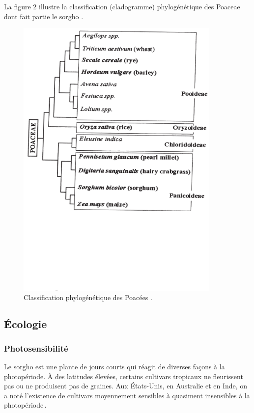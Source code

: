 \documentclass[a4paper,11pt]{article}
\begin{document}
La figure 2 illustre la classification (cladogramme) phylogénétique
des Poaceae dont fait partie le sorgho \cite{Paquet_2005}.



\begin{figure}%
  \begin{center}
    \includegraphics[width=10cm]{images/PhylogenyPoacea}
  \end{center}
\caption{Classification phylogénétique des Poacées \protect\cite{Paquet_2005}.}
\end{figure}


\subsection{Écologie}

\subsubsection{Photosensibilité}

Le sorgho est une plante de jours courts qui réagit de diverses façons
à la photopériode. À des latitudes élevées, certains cultivars
tropicaux ne fleurissent pas ou ne produisent pas de graines. Aux
États-Unis, en Australie et en Inde, on a noté l’existence de
cultivars moyennement sensibles à quasiment insensibles à la
photopériode\,\cite{BARRO_KONDOMBO_2010}.
\end{document}
